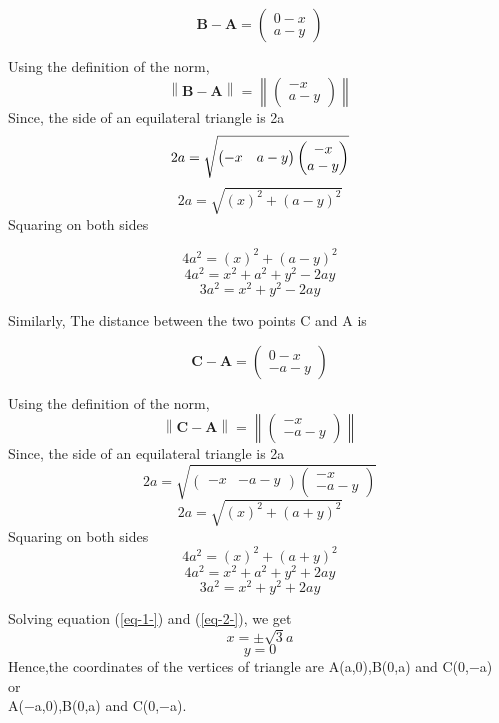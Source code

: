 \documentclass[journal,12pt,twocolumn]{IEEEtran}
\providecommand{\norm}[1]{\left\lVert#1\right\rVert}
\let\vec\mathbf
\newcommand{\myvec}[1]{\ensuremath{\begin{pmatrix}#1\end{pmatrix}}}
\begin{document}
\begin{equation}	
\vec{B}-\vec{A} = \myvec{0-x \\ a-y}
\end{equation}

\noindent Using the definition   of the norm, 
		\begin{equation}
\norm{\vec{B}-\vec{A}} =\norm{\myvec{-x \\ a-y}}
\end{equation}
\noindent Since, the side of an equilateral triangle is 2a	
\begin{equation}						
			2a=\sqrt{\myvec{-x & a-y}\myvec{-x \\ a-y}} 
\\
\end{equation}
\begin{equation}						
2a =  \sqrt{(x)^2+ (a-y)^2}
\end{equation}
\noindent Squaring on both sides

\begin{equation}						
4a^2 =  {(x)^2+ (a-y)^2}
\end{equation}
\begin{equation}
4a^2 = {x^2 + a^2 +y^2-2ay}
\end{equation}
\begin{equation}
3a^2 = {x^2+y^2-2ay}
\label{eq-1-}
\end{equation}

\noindent Similarly, The distance between the two points C and A is

\begin{equation}	
\vec{C}-\vec{A} = \myvec{0-x \\ -a-y}
\end{equation}

\noindent Using the definition   of the norm, 
		\begin{equation}
\norm{\vec{C}-\vec{A}} =\norm{\myvec{-x \\ -a-y}}
\end{equation}
\noindent Since, the side of an equilateral triangle is 2a	
\begin{equation}						
			2a=\sqrt{\myvec{-x & -a-y}\myvec{-x \\ -a-y}} 
\end{equation}
\begin{equation}						
2a =  \sqrt{(x)^2+ (a+y)^2}
\end{equation}
\noindent Squaring on both sides
\begin{equation}						
4a^2 =  {(x)^2+ (a+y)^2}
\end{equation}
\begin{equation}
4a^2 = {x^2 + a^2 +y^2+2ay}
\end{equation}
\begin{equation}
3a^2 = {x^2+y^2+2ay}
\label{eq-2-}
\end{equation}


Solving equation (\ref{eq-1-}) and (\ref{eq-2-}), we get
\begin{equation*}						
x =  \pm\sqrt{3}a 
\end{equation*}
\begin{equation}						
y=0
\end{equation}
Hence,the coordinates of the vertices of triangle are A(a,0),B(0,a) and C(0,−a) \\
  or\\
A(−a,0),B(0,a) and C(0,−a).
\end{document}
